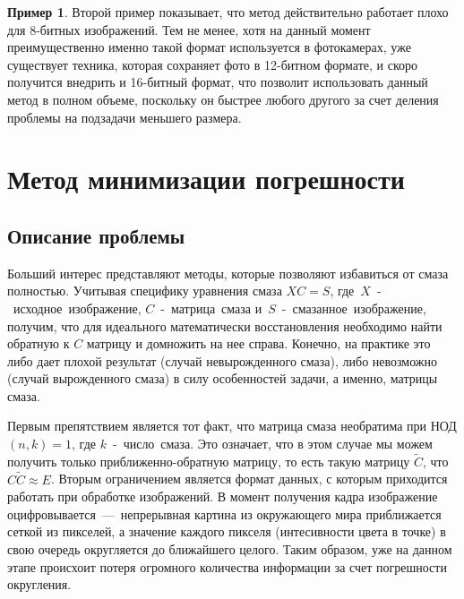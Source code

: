 \documentclass[a4paper]{article}
\theoremstyle{definition}
\newtheorem*{example}{Пример}
\begin{document}
\begin{example}

Второй пример показывает, что метод действительно работает плохо для 8-битных изображений. Тем не менее, хотя на данный момент преимущественно именно такой формат используется в фотокамерах, уже существует техника, которая сохраняет фото в 12-битном формате, и скоро получится внедрить и 16-битный формат, что позволит использовать данный метод в полном объеме, поскольку он быстрее любого другого за счет деления проблемы на подзадачи меньшего размера.

\end{example}


    \newpage


    \section{Метод минимизации погрешности}

    \subsection{Описание проблемы}


    Больший интерес представляют методы, которые позволяют избавиться от смаза полностью. Учитывая специфику уравнения смаза $XC = S$, где~$X$~-~исходное~изображение, $C$~-~матрица~смаза и~$S$~-~смазанное~изображение, получим, что для идеального математически восстановления необходимо найти обратную к $C$ матрицу и домножить на нее справа. Конечно, на практике это либо дает плохой результат (случай невырожденного смаза), либо невозможно (случай вырожденного смаза) в силу особенностей задачи, а именно, матрицы смаза.


    Первым препятствием является тот факт, что матрица смаза необратима при НОД$(n, k) = 1$, где $k$~-~число~смаза. Это означает, что в этом случае мы можем получить только приближенно-обратную матрицу, то есть такую матрицу $\tilde{C}$, что $C\tilde{C} \approx E$. Вторым ограничением является формат данных, с которым приходится работать при обработке изображений. В момент получения кадра изображение оцифровывается~---~непрерывная картина из окружающего мира приближается сеткой из пикселей, а значение каждого пикселя (интесивности цвета в точке) в свою очередь округляется до ближайшего целого. Таким образом, уже на данном этапе происхоит потеря огромного количества информации за счет погрешности округления.
\end{document}
